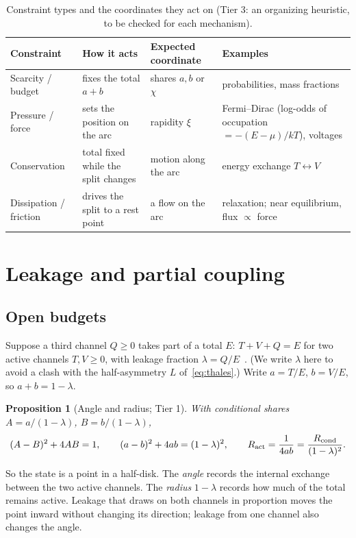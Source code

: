 \documentclass[11pt]{article}
\newtheorem{proposition}{Proposition}
\theoremstyle{definition}
\theoremstyle{remark}
\begin{document}
\begin{table}[ht]
\centering\small
\caption{Constraint types and the coordinates they act on (Tier 3: an organizing heuristic,
to be checked for each mechanism).}
\label{tab:constraints}
\begin{tabular}{@{}p{}p{}p{}p{}@{}}
\toprule
Constraint & How it acts & Expected coordinate & Examples\\
\midrule
Scarcity / budget & fixes the total $a+b$ & shares $a,b$ or $\chi$ & probabilities, mass fractions\\
Pressure / force & sets the position on the arc & rapidity $\xi$ & Fermi--Dirac (log-odds of occupation $=-(E-\mu)/kT$), voltages\\
Conservation & total fixed while the split changes & motion along the arc & energy exchange $T\leftrightarrow V$\\
Dissipation / friction & drives the split to a rest point & a flow on the arc & relaxation; near equilibrium, flux $\propto$ force~\cite{Onsager1931}\\
\bottomrule
\end{tabular}
\end{table}

\section{Leakage and partial coupling}\label{sec:leakage}

\subsection{Open budgets}
Suppose a third channel $Q\ge0$ takes part of a total $E$: $T+V+Q=E$ for two active channels
$T,V\ge0$, with leakage fraction $\lambda=Q/E$~\cite{DeJesus2026Fiber,DeJesus2026HL}.
(We write $\lambda$ here to avoid a clash with the half-asymmetry $L$ of~\eqref{eq:thales}.)
Write $a=T/E$, $b=V/E$, so $a+b=1-\lambda$.

\begin{proposition}[Angle and radius; Tier 1]\label{prop:leak}
With conditional shares $A=a/(1-\lambda)$, $B=b/(1-\lambda)$,
\[
(A-B)^2+4AB=1,\qquad (a-b)^2+4ab=(1-\lambda)^2,\qquad
R_{\rm act}=\frac{1}{4ab}=\frac{R_{\rm cond}}{(1-\lambda)^2}.
\]
\end{proposition}

So the state is a point in a half-disk. The \emph{angle} records the internal exchange
between the two active channels. The \emph{radius} $1-\lambda$ records how much of the
total remains active. Leakage that draws on both channels in proportion moves the point
inward without changing its direction; leakage from one channel also changes the angle.
\end{document}
